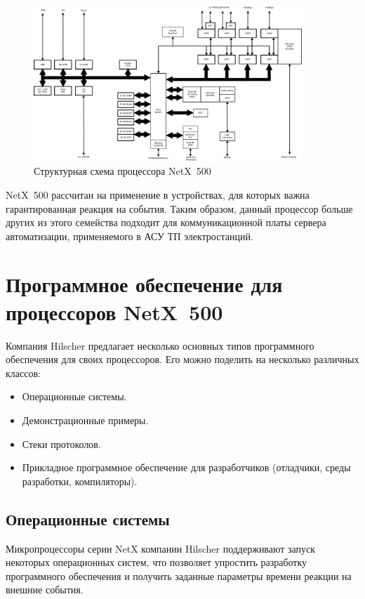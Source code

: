 \documentclass[a4paper,14pt,bachelor]{disser}
\begin{document}
\begin{figure}[h!] %
\addtocounter{myfigs}{1}
 \begin{center}
 \includegraphics[width=0.9\textwidth]{netx500}
 \caption{\label{netx500-scheme} Структурная схема процессора NetX~500}
 \end{center}
\end{figure}

NetX~500 рассчитан на применение в устройствах, для которых важна гарантированная реакция на события. Таким образом, данный процессор больше других из этого семейства подходит для коммуникационной платы сервера автоматизации, применяемого в АСУ ТП электростанций.

\section{Программное обеспечение для процессоров NetX~500}
Компания Hilscher предлагает несколько основных типов программного обеспечения для своих процессоров. Его можно поделить на несколько различных классов:
\begin{itemize}
 \item Операционные системы.
 \item Демонстрационные примеры.
 \item Стеки протоколов.
 \item Прикладное программное обеспечение для разработчиков (отладчики, среды разработки, компиляторы).
\end{itemize}

\subsection{Операционные системы}
Микропроцессоры серии NetX компании Hilscher поддерживают запуск некоторых операционных систем, что позволяет упростить разработку программного обеспечения и получить заданные параметры времени реакции на внешние события.
\end{document}
